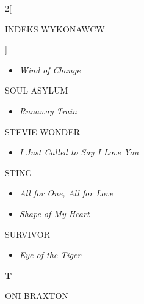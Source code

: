 \documentclass[a4paper]{report}
\begin{document}
\begin{multicols*}{2}[\begin{Huge}INDEKS WYKONAWCW\end{Huge}\vspace{1cm}]
\begin{minipage}{\columnwidth}
\begin{itemize}[topsep=3pt, after=\vspace{3mm}]
		\itemsep0em
		\item[]\textit{Wind of Change}  \\
	\end{itemize}
\end{minipage}
\begin{minipage}{\columnwidth}
	SOUL ASYLUM 
	\begin{itemize}[topsep=3pt, after=\vspace{3mm}]
		\itemsep0em
		\item[]\textit{Runaway Train}  \\
	\end{itemize}
\end{minipage}
\begin{minipage}{\columnwidth}
	STEVIE WONDER 
	\begin{itemize}[topsep=3pt, after=\vspace{3mm}]
		\itemsep0em
		\item[]\textit{I Just Called to Say I Love You}  \\
	\end{itemize}
\end{minipage}
\begin{minipage}{\columnwidth}
	STING 
	\begin{itemize}[topsep=3pt, after=\vspace{3mm}]
		\itemsep0em
		\item[]\textit{All for One, All for Love}  \\
		\item[]  \textit{Shape of My Heart}  \\
	\end{itemize}
\end{minipage}
\begin{minipage}{\columnwidth}
	SURVIVOR 
	\begin{itemize}[topsep=3pt, after=\vspace{3mm}]
		\itemsep0em
		\item[]\textit{Eye of the Tiger}  \\
	\end{itemize}
\end{minipage}
\begin{minipage}{\columnwidth}
	\begin{Large}\textbf{T}\end{Large}ONI BRAXTON 
	\begin{itemize}[topsep=3pt, after=\vspace{3mm}]

\end{itemize}
\end{minipage}
\end{multicols*}
\end{document}
